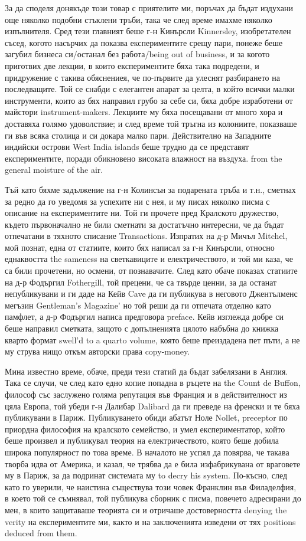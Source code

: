 \documentclass[12pt]{book}
\begin{document}
За да споделя донякъде този товар с приятелите ми, поръчах да бъдат издухани още няколко подобни стъклени тръби, така че след време имахме няколко изпълнителя. Сред тези главният беше г-н Кинърсли Kinnersley, изобретателен съсед, когото насърчих да показва експериментите срещу пари, понеже беше загубил бизнеса си/останал без работа/being out of business, и за когото приготвих две лекции, в които експериментите бяха така подредени, и придружение с такива обяснениея, че по-първите да улеснят разбирането на последващите. Той се снабди с елегантен апарат за целта, в който всички малки инструменти, които аз бях направил грубо за себе си, бяха добре изработени от майстори instrument-makers. Лекциите му бяха посещавани от много хора и доставяха голямо удоволствие; и след време той тръгна из колониите, показваше ги във всяка столица и си докара малко пари. Действително на Западните индийски острови West India islands беше трудно да се представят експериментите, поради обикновено високата влажност на въздуха. from the general moisture of
the air.

Тъй като бяхме задължение на г-н Колинсън за подарената тръба и т.н., сметнах за редно да го уведомя за успехите ни с нея, и му писах няколко писма с описание на експериментите ни. Той ги прочете пред Кралското дружество, където първоначално не били сметнати за достатъчно интересни, че да бъдат отпечатани в тяхното списание Transactions. Изпратих на д-р Мичъл Mitchel, мой познат, една от статиите, които бях написал за г-н Кинърсли, относно еднаквостта the sameness на светкавиците и електричеството, и той ми каза, че са били прочетени, но осмени, от познавачите. След като обаче показах статиите на д-р Фодъргил Fothergill, той прецени, че са твърде ценни, за да останат непубликувани и ги даде на Кейв Cave да ги публикува в неговото Джентълменс мегъзин Gentleman's Magazine' но той реши да ги отпечата отделно като памфлет, а д-р Фодъргил написа предговора preface. Кейв изглежда добре си беше направил сметката, защото с допълненията цялото набъбна до книжка кварто формат swell'd to a quarto volume, която беше преиздадена пет пъти, а не му струва нищо откъм авторски права copy-money.

Мина известно време, обаче, преди тези статий да бъдат забелязани в Англия. Така се случи, че след като едно копие попадна в ръцете на the Count de Buffon, философ със заслужено голяма репутация във Франция и в действителност из цяла Европа, той убеди г-н Далибар Dalibard да ги преведе на френски и те бяха публикувани в Париж. Публикуването обиди абатът Ноле Nollet, preceptor по приордна философия на кралското семейство, и умел експериментатор, който беше произвел и публикувал теория на електричеството, която беше добила широка популярност по това време. В началото не успял да повярва, че такава творба идва от Америка, и казал, че трябва да е била изфабрикувана от враговете му в Париж, за да подринат системата му to decry his system. По-късно, след като го уверили, че наистина съществува този човек Франклин във Филаделфия, в което той се съмнявал, той публикува сборник с писма, повечето адресирани до мен, в които защитаваше теорията си и отричаше достоверността denying the verity на експериментите ми, както и на заключенията изведени от тях positions deduced from them. 
\end{document}
